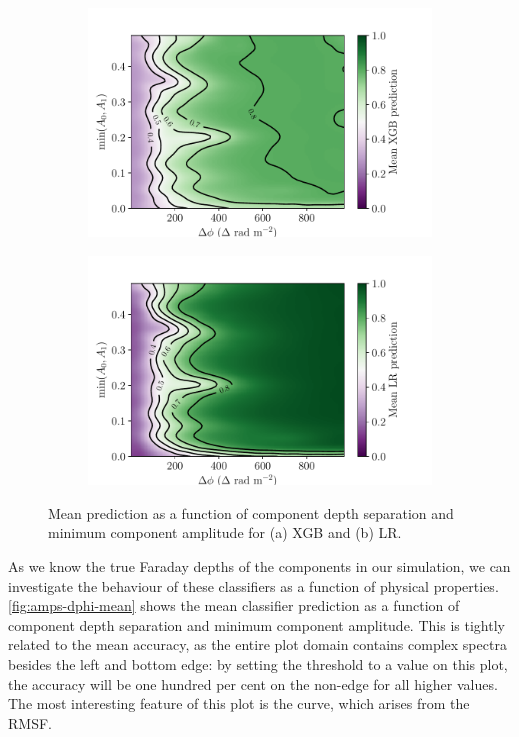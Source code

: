     \begin{figure}
      \begin{subfigure}{\linewidth}
        \includegraphics[width=\linewidth]{faraday-images/mean_xgb_prediction_dphi_amp.pdf}
        \caption{\label{fig:faraday-mean-xgb-pred}}
      \end{subfigure}
      \begin{subfigure}{\linewidth}
        \includegraphics[width=\linewidth]{faraday-images/mean_lr_prediction_dphi_amp.pdf} 
        \caption{\label{fig:faraday-mean-lr-pred}}
      \end{subfigure}
      \caption{\label{fig:faraday-amps-dphi-mean} Mean prediction as a function of component depth separation and minimum component amplitude for (a) XGB and (b) LR.}
    \end{figure}

    As we know the true Faraday depths of the components in our simulation, we can investigate the behaviour of these classifiers as a function of physical properties. \autoref{fig:amps-dphi-mean} shows the mean classifier prediction as a function of component depth separation and minimum component amplitude. This is tightly related to the mean accuracy, as the entire plot domain contains complex spectra besides the left and bottom edge: by setting the threshold to a value on this plot, the accuracy will be one hundred per cent on the non-edge for all higher values. The most interesting feature of this plot is the curve, which arises from the RMSF.

